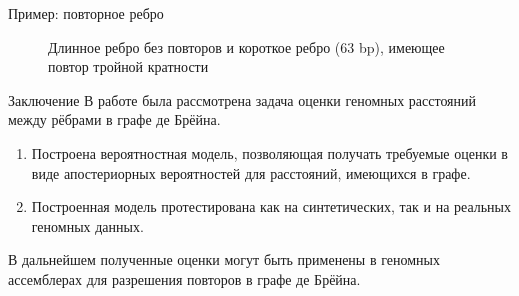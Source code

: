 \documentclass[unicode, notheorems]{beamer}
\begin{document}
\begin{frame}{Пример: повторное ребро}
\begin{figure}%
	\centering
	\qquad
	\caption{Длинное ребро без повторов и короткое ребро (63 bp), имеющее повтор тройной кратности}
\end{figure}
\end{frame}

\begin{frame}{Заключение}
	В работе была рассмотрена задача оценки геномных расстояний между рёбрами в графе де Брёйна.
	\bigskip
	\begin{enumerate}
		\item Построена вероятностная модель, позволяющая получать требуемые оценки в виде апостериорных вероятностей для расстояний, имеющихся в графе.
		\item Построенная модель протестирована как на синтетических, так и на реальных геномных данных.
	\end{enumerate}
	\bigskip
	В дальнейшем полученные оценки могут быть применены в геномных ассемблерах для разрешения повторов в графе де Брёйна. 
\end{frame}
\end{document}
